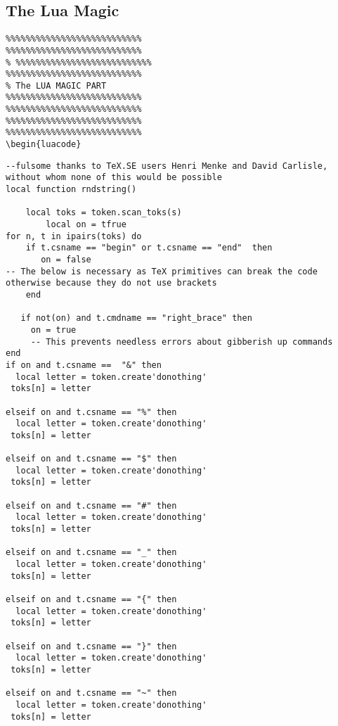 \documentclass{article}
\begin{document}
\subsection{The Lua Magic}
\begin{verbatim}
%%%%%%%%%%%%%%%%%%%%%%%%%%%
%%%%%%%%%%%%%%%%%%%%%%%%%%%
% %%%%%%%%%%%%%%%%%%%%%%%%%%%
%%%%%%%%%%%%%%%%%%%%%%%%%%%
% The LUA MAGIC PART
%%%%%%%%%%%%%%%%%%%%%%%%%%%
%%%%%%%%%%%%%%%%%%%%%%%%%%%
%%%%%%%%%%%%%%%%%%%%%%%%%%%
%%%%%%%%%%%%%%%%%%%%%%%%%%%
\begin{luacode}
\end{verbatim}
\begin{verbatim}
--fulsome thanks to TeX.SE users Henri Menke and David Carlisle, without whom none of this would be possible 
local function rndstring()

    local toks = token.scan_toks(s)
        local on = tfrue
for n, t in ipairs(toks) do
    if t.csname == "begin" or t.csname == "end"  then
       on = false
-- The below is necessary as TeX primitives can break the code otherwise because they do not use brackets       
    end
   
   if not(on) and t.cmdname == "right_brace" then
     on = true
     -- This prevents needless errors about gibberish up commands
end
if on and t.csname ==  "&" then
  local letter = token.create'donothing'
 toks[n] = letter

elseif on and t.csname == "%" then
  local letter = token.create'donothing'
 toks[n] = letter

elseif on and t.csname == "$" then
  local letter = token.create'donothing'
 toks[n] = letter

elseif on and t.csname == "#" then
  local letter = token.create'donothing'
 toks[n] = letter

elseif on and t.csname == "_" then
  local letter = token.create'donothing'
 toks[n] = letter

elseif on and t.csname == "{" then
  local letter = token.create'donothing'
 toks[n] = letter

elseif on and t.csname == "}" then
  local letter = token.create'donothing'
 toks[n] = letter

elseif on and t.csname == "~" then
  local letter = token.create'donothing'
 toks[n] = letter


\end{verbatim}
\end{document}
